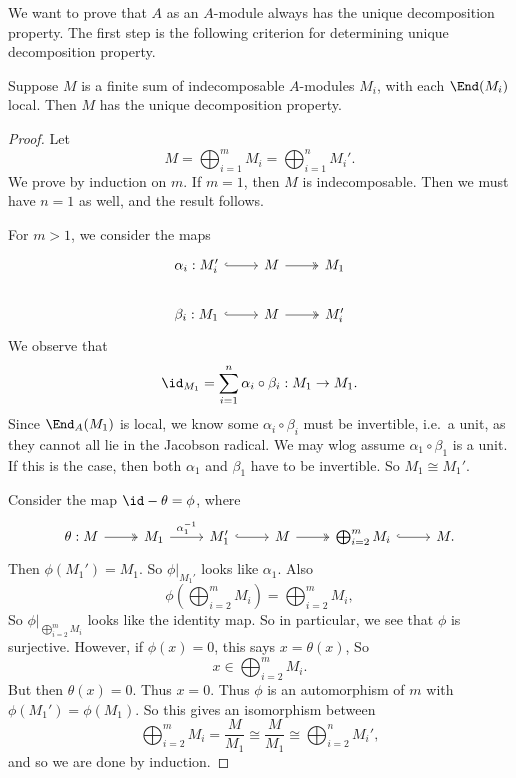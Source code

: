\documentclass[a4paper]{article}
\begin{document}
We want to prove that $A$ as an $A$-module always has the unique decomposition property. The first step is the following criterion for determining unique decomposition property.

\begin{thm}
  Suppose $M$ is a finite sum of indecomposable $A$-modules $M_i$, with each $\End(M_i)$ local. Then $M$ has the unique decomposition property.
\end{thm}

\begin{proof} %
  Let
  \[
    M = \bigoplus_{i = 1}^m M_i = \bigoplus_{i = 1}^n M_i'.
  \]
  We prove by induction on $m$. If $m = 1$, then $M$ is indecomposable. Then we must have $n = 1$ as well, and the result follows.

  For $m > 1$, we consider the maps
  \[
    \begin{tikzcd}
      \alpha_i: M_i' \ar[r, hook] & M \ar[r, two heads] & M_1\\
      \beta_i: M_1 \ar[r, hook] & M \ar[r, two heads] & M_i'
    \end{tikzcd}
  \]
  We observe that
  \[
    \id_{M_1} = \sum_{i = 1}^n \alpha_i \circ \beta_i: M_1 \to M_1.
  \]
  Since $\End_A(M_1)$ is local, we know some $\alpha_i \circ \beta_i$ must be invertible, i.e.\ a unit, as they cannot all lie in the Jacobson radical. We may wlog assume $\alpha_1 \circ \beta_1$ is a unit. If this is the case, then both $\alpha_1$ and $\beta_1$ have to be invertible. So $M_1 \cong M_1'$. %

  Consider the map $\id - \theta = \phi$, where
  \[
    \begin{tikzcd}
      \theta: M \ar[r, two heads] & M_1 \ar[r, "\alpha_1^{-1}"] & M_1' \ar[r, hook] & M \ar[r, two heads] & \bigoplus_{i = 2}^m M_i \ar[r, hook] & M.
    \end{tikzcd}
  \]
  Then $\phi(M_1') = M_1$. So $\phi|_{M_1'}$ looks like $\alpha_1$. Also
  \[
    \phi\left(\bigoplus_{i = 2}^m M_i\right) = \bigoplus_{i = 2}^m M_i,
  \]
  So $\phi|_{\bigoplus_{i = 2}^m M_i}$ looks like the identity map. So in particular, we see that $\phi$ is surjective. However, if $\phi(x) = 0$, this says $x = \theta(x)$, So
  \[
    x \in \bigoplus_{i = 2}^m M_i.
  \]
  But then $\theta(x) = 0$. Thus $x = 0$. Thus $\phi$ is an automorphism of $m$ with $\phi(M_1') = \phi(M_1)$. So this gives an isomorphism between
  \[
    \bigoplus_{i = 2}^m M_i = \frac{M}{M_1} \cong \frac{M}{M_1} \cong \bigoplus_{i = 2}^n M_i',
  \]
  and so we are done by induction.
\end{proof}
\end{document}
